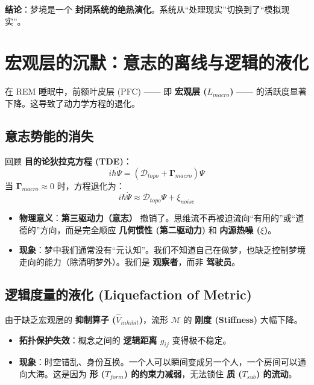 \textbf{结论}：梦境是一个 \textbf{封闭系统的绝热演化}。系统从“处理现实”切换到了“模拟现实”。

\section{宏观层的沉默：意志的离线与逻辑的液化}
\label{sec:section_4656}

在 REM 睡眠中，前额叶皮层 (PFC) —— 即 \textbf{宏观层 ($L_{macro}$)} —— 的活跃度显著下降。这导致了动力学方程的退化。

\subsection{意志势能的消失}

回顾 \textbf{目的论狄拉克方程 (TDE)}：
\begin{equation}
i \hbar \dot{\Psi} = (\mathcal{D}_{topo} + \mathbf{\Gamma}_{macro}) \Psi
\end{equation}
当 $\mathbf{\Gamma}_{macro} \approx 0$ 时，方程退化为：
\begin{equation}
i \hbar \dot{\Psi} \approx \mathcal{D}_{topo} \Psi + \xi_{noise}
\end{equation}

\begin{itemize}
    \item \textbf{物理意义}：\textbf{第三驱动力（意志）} 撤销了。思维流不再被迫流向“有用的”或“道德的”方向，而是完全顺应 \textbf{几何惯性 (第二驱动力)} 和 \textbf{内源热噪 ($\xi$)}。
    \item \textbf{现象}：梦中我们通常没有“元认知”。我们不知道自己在做梦，也缺乏控制梦境走向的能力（除清明梦外）。我们是 \textbf{观察者}，而非 \textbf{驾驶员}。
\end{itemize}

\subsection{逻辑度量的液化 (Liquefaction of Metric)}

由于缺乏宏观层的 \textbf{抑制算子 ($\hat{V}_{inhibit}$)}，流形 $\mathcal{M}$ 的 \textbf{刚度 (Stiffness)} 大幅下降。

\begin{itemize}
    \item \textbf{拓扑保护失效}：概念之间的 \textbf{逻辑距离 $g_{ij}$} 变得极不稳定。
    \item \textbf{现象}：时空错乱、身份互换。一个人可以瞬间变成另一个人，一个房间可以通向大海。这是因为 \textbf{形 ($T_{form}$) 的约束力减弱}，无法锁住 \textbf{质 ($T_{sub}$) 的流动}。
\end{itemize}

